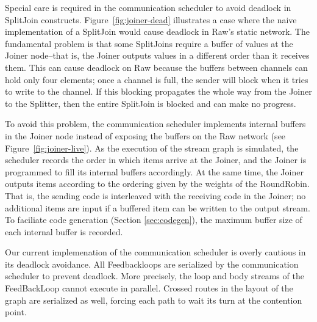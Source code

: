 % 

Special care is required in the communication scheduler to avoid
deadlock in SplitJoin constructs.  Figure~\ref{fig:joiner-dead}
illustrates a case where the naive implementation of a SplitJoin would
cause deadlock in Raw's static network.  The fundamental problem is
that some SplitJoins require a buffer of values at the Joiner
node--that is, the Joiner outputs values in a different order than it
receives them.  This can cause deadlock on Raw because the buffers
between channels can hold only four elements; once a channel is full,
the sender will block when it tries to write to the channel.  If this
blocking propagates the whole way from the Joiner to the Splitter,
then the entire SplitJoin is blocked and can make no progress.

To avoid this problem, the communication scheduler implements internal
buffers in the Joiner node instead of exposing the buffers on the Raw
network (see Figure~\ref{fig:joiner-live}).  As the execution of the
stream graph is simulated, the scheduler records the order in which
items arrive at the Joiner, and the Joiner is programmed to fill its
internal buffers accordingly.  At the same time, the Joiner outputs
items according to the ordering given by the weights of the
RoundRobin.  That is, the sending code is interleaved with the
receiving code in the Joiner; no additional items are input if a
buffered item can be written to the output stream.  To faciliate code
generation (Section \ref{sec:codegen}), the maximum buffer size of
each internal buffer is recorded.

Our current implemenation of the communication scheduler is overly
cautious in its deadlock avoidance.  All Feedbackloops are serialized
by the communication scheduler to prevent deadlock.  More precisely,
the loop and body streams of the FeedBackLoop cannot execute in
parallel.  Crossed routes in the layout of the graph are serialized as
well, forcing each path to wait its turn at the contention point.
